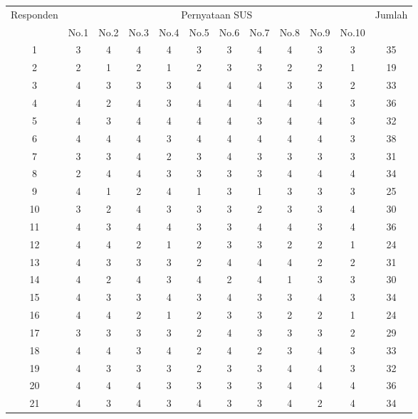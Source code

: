 \begin{landscape}
	\begin{flushleft}
	\end{flushleft}
	
	\begin{longtable}{|c|c|c|c|c|c|c|c|c|c|c|c|}
		
		\hline
		\multirow{2}{*}{Responden} & \multicolumn{10}{c|}{Pernyataan SUS} & 
		\multirow{2}{*}{Jumlah} \\
		
		\cline{2-11} & No.1 & No.2 & No.3 & No.4 & No.5 & No.6 & No.7 & No.8 & No.9 & No.10 &\\ \hline 
		1 & 3& 4& 4& 4& 3& 3& 4& 4& 3& 3& 35 \\ \hline
		2 & 2& 1& 2& 1& 2& 3& 3& 2& 2& 1& 19 \\ \hline
		3 & 4& 3& 3& 3& 4& 4& 4& 3& 3& 2& 33  \\ \hline
		4 & 4& 2& 4& 3& 4& 4& 4& 4& 4& 3& 36 \\ \hline
		5 & 4& 3& 4& 4& 4& 4& 3& 4& 4& 3& 32  \\ \hline
		6 & 4& 4& 4& 3& 4& 4& 4& 4& 4& 3& 38 \\ \hline
		7 & 3& 3& 4& 2& 3& 4& 3& 3& 3& 3& 31 \\ \hline
		8 & 2& 4& 4& 3& 3& 3& 3& 4& 4& 4& 34 \\ \hline
		9 & 4& 1& 2& 4& 1& 3& 1& 3& 3& 3& 25 \\ \hline
		10& 3& 2& 4& 3& 3& 3& 2& 3& 3& 4& 30 \\ \hline
		11& 4& 3& 4& 4& 3& 3& 4& 4& 3& 4& 36 \\ \hline
		12& 4& 4& 2& 1& 2& 3& 3& 2& 2& 1& 24 \\ \hline
		13& 4& 3& 3& 3& 2& 4& 4& 4& 2& 2& 31 \\ \hline
		14& 4& 2& 4& 3& 4& 2& 4& 1& 3& 3& 30  \\ \hline
		15& 4& 3& 3& 4& 3& 4& 3& 3& 4& 3& 34 \\ \hline
		16& 4& 4& 2& 1& 2& 3& 3& 2& 2& 1& 24 \\ \hline
		17& 3& 3& 3& 3& 2& 4& 3& 3& 3& 2& 29 \\ \hline
		18& 4& 4& 3& 4& 2& 4& 2& 3& 4& 3& 33 \\ \hline
		19& 4& 3& 3& 3& 2& 3& 3& 4& 4& 3& 32 \\ \hline
		20& 4& 4& 4& 3& 3& 3& 3& 4& 4& 4& 36 \\ \hline
		21& 4& 3& 4& 3& 4& 3& 3& 4& 2& 4& 34 \\ \hline

\end{longtable}
\end{landscape}
